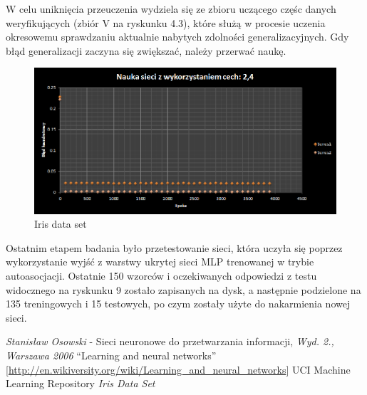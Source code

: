 \documentclass{classrep}
\begin{document}
W celu uniknięcia przeuczenia wydziela się ze zbioru uczącego częśc danych weryfikujących (zbiór V na ryskunku 4.3), które służą w procesie uczenia okresowemu sprawdzaniu aktualnie nabytych zdolności generalizacyjnych. Gdy błąd generalizacji zaczyna się zwiększać, należy przerwać naukę.


\clearpage
\begin{figure}[ht]
\centering
			\includegraphics[scale=0.65]{pictures/Iris12.png}
	\caption{Iris data set}
	\label{fig:Iris data set}
\end{figure}
Ostatnim etapem badania było przetestowanie sieci, która uczyła się poprzez wykorzystanie wyjść z warstwy ukrytej sieci MLP trenowanej w trybie autoasocjacji. Ostatnie 150 wzorców i oczekiwanych odpowiedzi z testu widocznego na ryskunku 9 zostało zapisanych na dysk, a następnie podzielone na 135 treningowych i 15 testowych, po czym zostały użyte do nakarmienia nowej sieci.

\begin{thebibliography}{0}
   \textsl{Stanisław Osowski} - Sieci neuronowe do przetwarzania informacji, \textsl{Wyd. 2., Warszawa 2006}
   ``Learning and neural networks'' [\url{http://en.wikiversity.org/wiki/Learning_and_neural_networks}]
   UCI Machine Learning Repository \textsl{Iris Data Set}
\end{thebibliography}
\end{document}
